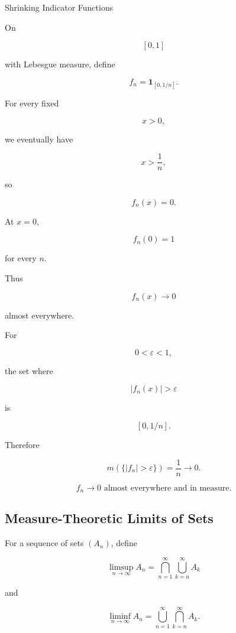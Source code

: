 \begin{workedexamplebox}{Shrinking Indicator Functions}

On

\[
[0,1]
\]

with Lebesgue measure, define

\[
f_n
=
\mathbf{1}_{[0,1/n]}.
\]

For every fixed

\[
x>0,
\]

we eventually have

\[
x>\frac1n,
\]

so

\[
f_n(x)=0.
\]

At \(x=0\),

\[
f_n(0)=1
\]

for every \(n\).

Thus

\[
f_n(x)\to0
\]

almost everywhere.

For

\[
0<\varepsilon<1,
\]

the set where

\[
|f_n(x)|>\varepsilon
\]

is

\[
[0,1/n].
\]

Therefore

\[
m\left(
\{|f_n|>\varepsilon\}
\right)
=
\frac1n
\to0.
\]

\begin{answerbox}
\[
\boxed{
f_n\to0
\text{ almost everywhere and in measure}.
}
\]
\end{answerbox}
\end{workedexamplebox}

\subsection{Measure-Theoretic Limits of Sets}
\label{subsec:limsup-liminf-sets}

For a sequence of sets \((A_n)\), define

\[
\boxed{
\limsup_{n\to\infty}A_n
=
\bigcap_{n=1}^{\infty}
\bigcup_{k=n}^{\infty}A_k
}
\]

and

\[
\boxed{
\liminf_{n\to\infty}A_n
=
\bigcup_{n=1}^{\infty}
\bigcap_{k=n}^{\infty}A_k.
}
\]

